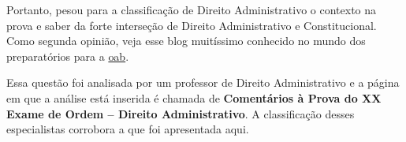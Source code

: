 \documentclass{article}
\begin{document}
Portanto, pesou para a classificação de Direito Administrativo o
contexto na prova e saber da forte interseção de Direito
Administrativo e Constitucional. Como segunda opinião, veja esse blog
muitíssimo conhecido no mundo dos preparatórios para a
\href{https://www.estrategiaconcursos.com.br/blog/comentarios-administrativo-oab/}{oab}.

Essa questão foi analisada por um professor de Direito Administrativo
e a página em que a análise está inserida é chamada de
\textbf{Comentários à Prova do XX Exame de Ordem – Direito
  Administrativo}. A classificação desses especialistas corrobora a
que foi apresentada aqui.
\end{document}
